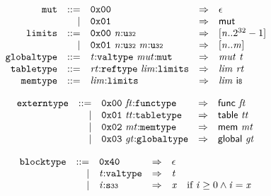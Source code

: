 $$
\begin{array}{@{}l@{}rrlll@{}l@{}}
& {\mathtt{mut}} &::=& \mathtt{0x00} &\Rightarrow& \epsilon \\ &&|&
\mathtt{0x01} &\Rightarrow& \mathsf{mut} \\
& {\mathtt{limits}} &::=& \mathtt{0x00}~{\mathit{n}}{:}{\mathtt{u{\scriptstyle32}}} &\Rightarrow& {}[{\mathit{n}} .. {2^{32}} - 1] \\ &&|&
\mathtt{0x01}~{\mathit{n}}{:}{\mathtt{u{\scriptstyle32}}}~{\mathit{m}}{:}{\mathtt{u{\scriptstyle32}}} &\Rightarrow& {}[{\mathit{n}} .. {\mathit{m}}] \\
& {\mathtt{globaltype}} &::=& {\mathit{t}}{:}{\mathtt{valtype}}~{\mathit{mut}}{:}{\mathtt{mut}} &\Rightarrow& {\mathit{mut}}~{\mathit{t}} \\
& {\mathtt{tabletype}} &::=& {\mathit{rt}}{:}{\mathtt{reftype}}~{\mathit{lim}}{:}{\mathtt{limits}} &\Rightarrow& {\mathit{lim}}~{\mathit{rt}} \\
& {\mathtt{memtype}} &::=& {\mathit{lim}}{:}{\mathtt{limits}} &\Rightarrow& {\mathit{lim}}~\mathsf{i{\scriptstyle8}} \\
\end{array}
$$

\vspace{1ex}

$$
\begin{array}{@{}l@{}rrlll@{}l@{}}
& {\mathtt{externtype}} &::=& \mathtt{0x00}~{\mathit{ft}}{:}{\mathtt{functype}} &\Rightarrow& \mathsf{func}~{\mathit{ft}} \\ &&|&
\mathtt{0x01}~{\mathit{tt}}{:}{\mathtt{tabletype}} &\Rightarrow& \mathsf{table}~{\mathit{tt}} \\ &&|&
\mathtt{0x02}~{\mathit{mt}}{:}{\mathtt{memtype}} &\Rightarrow& \mathsf{mem}~{\mathit{mt}} \\ &&|&
\mathtt{0x03}~{\mathit{gt}}{:}{\mathtt{globaltype}} &\Rightarrow& \mathsf{global}~{\mathit{gt}} \\
\end{array}
$$

\vspace{1ex}

\vspace{1ex}

$$
\begin{array}{@{}l@{}rrlll@{}l@{}}
& {\mathtt{blocktype}} &::=& \mathtt{0x40} &\Rightarrow& \epsilon \\ &&|&
{\mathit{t}}{:}{\mathtt{valtype}} &\Rightarrow& {\mathit{t}} \\ &&|&
{\mathit{i}}{:}{\mathtt{s{\scriptstyle33}}} &\Rightarrow& {\mathit{x}} &\quad
  \mbox{if}~{\mathit{i}} \geq 0 \land {\mathit{i}} = {\mathit{x}} \\
\end{array}
$$

